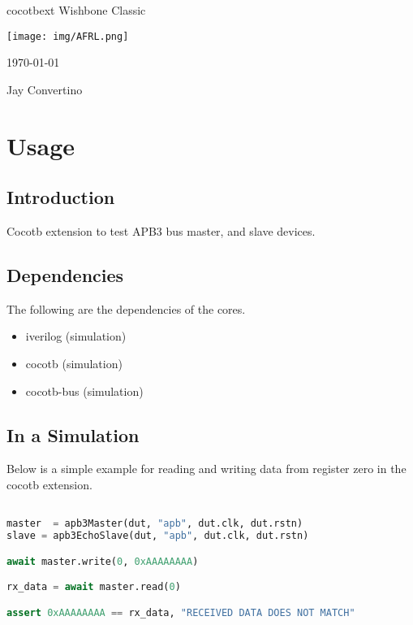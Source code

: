\begin{titlepage}
  \begin{center}

  {\Huge cocotbext Wishbone Classic}

  \vspace{25mm}

  \texttt{[image: img/AFRL.png]}

  \vspace{25mm}

  \today

  \vspace{15mm}

  {\Large Jay Convertino}

  \end{center}
\end{titlepage}

\tableofcontents

\newpage

\section{Usage}

\subsection{Introduction}

\par
Cocotb extension to test APB3 bus master, and slave devices.

\subsection{Dependencies}

\par
The following are the dependencies of the cores.

\begin{itemize}
  \item iverilog (simulation)
  \item cocotb (simulation)
  \item cocotb-bus (simulation)
\end{itemize}

\subsection{In a Simulation}
\par
Below is a simple example for reading and writing data from register zero in the cocotb extension.
\begin{lstlisting}[language=Python]

master  = apb3Master(dut, "apb", dut.clk, dut.rstn)
slave = apb3EchoSlave(dut, "apb", dut.clk, dut.rstn)

await master.write(0, 0xAAAAAAAA)

rx_data = await master.read(0)

assert 0xAAAAAAAA == rx_data, "RECEIVED DATA DOES NOT MATCH"

\end{lstlisting}

